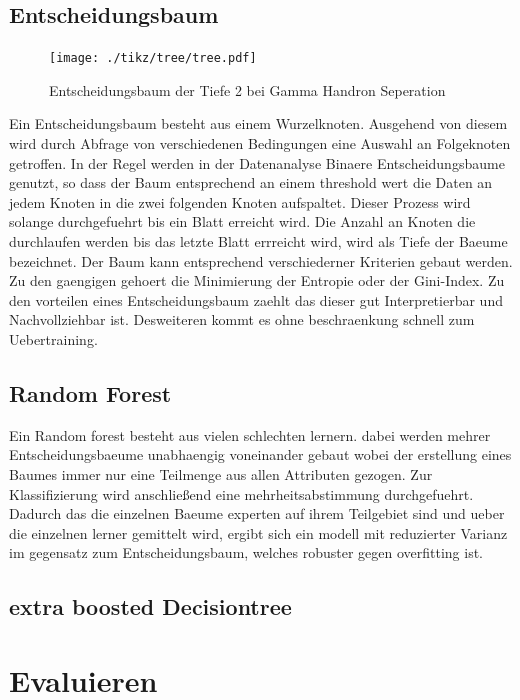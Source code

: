 \subsection{Entscheidungsbaum}
\begin{figure}
  \centering
  \texttt{[image: ./tikz/tree/tree.pdf]}
  \caption{Entscheidungsbaum der Tiefe 2 bei Gamma Handron Seperation}
\end{figure}
Ein Entscheidungsbaum besteht aus einem Wurzelknoten. Ausgehend von diesem wird durch Abfrage von verschiedenen Bedingungen eine Auswahl an Folgeknoten getroffen. In der Regel werden in der Datenanalyse Binaere Entscheidungsbaume genutzt, so dass der Baum entsprechend an einem threshold wert die Daten an jedem Knoten in die zwei folgenden Knoten aufspaltet. Dieser Prozess wird solange durchgefuehrt bis ein Blatt erreicht wird. Die Anzahl an Knoten die durchlaufen werden bis das letzte Blatt errreicht wird, wird als Tiefe der Baeume bezeichnet.
Der Baum kann entsprechend verschiederner Kriterien gebaut werden. Zu den gaengigen gehoert die Minimierung der Entropie oder der Gini-Index. 
Zu den vorteilen eines Entscheidungsbaum zaehlt das dieser gut Interpretierbar und Nachvollziehbar ist. Desweiteren kommt es ohne beschraenkung schnell zum Uebertraining.
\subsection{Random Forest}
Ein Random forest besteht aus vielen schlechten lernern. dabei werden mehrer Entscheidungsbaeume unabhaengig voneinander gebaut wobei der erstellung eines Baumes immer nur eine Teilmenge aus allen Attributen gezogen. Zur Klassifizierung wird anschließend eine mehrheitsabstimmung durchgefuehrt. Dadurch das die einzelnen Baeume experten auf ihrem Teilgebiet sind und ueber die einzelnen lerner gemittelt wird, ergibt sich ein modell mit reduzierter Varianz im gegensatz zum Entscheidungsbaum, welches robuster gegen overfitting ist.
\subsection{extra boosted Decisiontree}

\section{Evaluieren}

